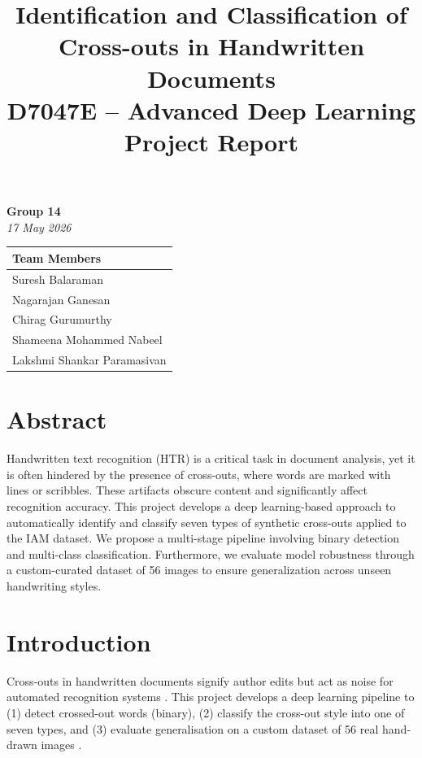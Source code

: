 \documentclass[12pt, a4paper]{article}
\title{
    \vspace{-2cm}
    \textbf{Identification and Classification of Cross-outs in Handwritten Documents} \\
    \large D7047E -- Advanced Deep Learning \\
    \large Project Report
}
\author{} %
\date{}   %
\begin{document}
\maketitle

\begin{center}
    \vspace{-1cm}
    \textbf{Group 14} \\
    \textit{17 May 2026} \\
    \vspace{0.5cm}
    
    \begin{tabular}{l}
    \toprule
    \textbf{Team Members} \\ \midrule
    Suresh Balaraman \\
    Nagarajan Ganesan \\
    Chirag Gurumurthy \\
    Shameena Mohammed Nabeel \\
    Lakshmi Shankar Paramasivan \\ \bottomrule
    \end{tabular}
\end{center}

\tableofcontents
\newpage

\section{Abstract}
Handwritten text recognition (HTR) is a critical task in document analysis, yet it is often hindered by the presence of cross-outs, where words are marked with lines or scribbles. These artifacts obscure content and significantly affect recognition accuracy. This project develops a deep learning-based approach to automatically identify and classify seven types of synthetic cross-outs applied to the IAM dataset. We propose a multi-stage pipeline involving binary detection and multi-class classification. Furthermore, we evaluate model robustness through a custom-curated dataset of 56 images to ensure generalization across unseen handwriting styles.

\section{Introduction}

Cross-outs in handwritten documents signify author edits but act as noise for automated recognition systems \cite{handout}. This project develops a deep learning pipeline to (1) detect crossed-out words (binary), (2) classify the cross-out style into one of seven types, and (3) evaluate generalisation on a custom dataset of 56 real hand-drawn images \cite{handout}.
\end{document}
